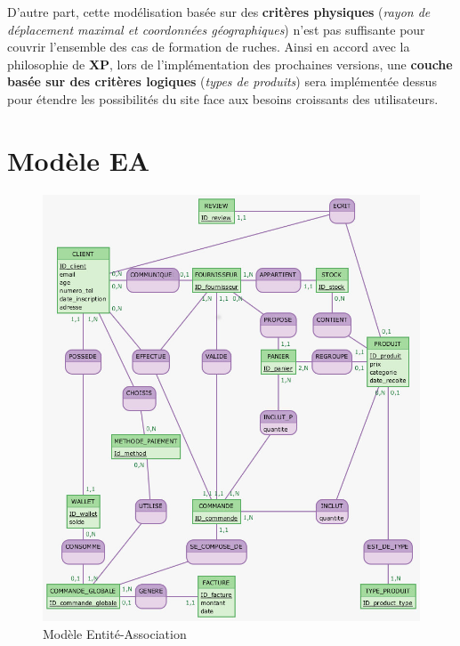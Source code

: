 \documentclass[a4paper,12pt]{report}
\theoremstyle{break}
\theoremstyle{break}
\theoremstyle{break}
\theoremstyle{break}
\theoremstyle{definition}
\theoremstyle{remark}
\begin{document}
D'autre part, cette modélisation basée sur des \textbf{critères physiques} (\textit{rayon de déplacement maximal et coordonnées géographiques}) n'est pas suffisante pour couvrir l'ensemble des cas de formation de ruches. Ainsi en accord avec la philosophie de \textbf{XP}, lors de l'implémentation des prochaines versions, une \textbf{couche basée sur des critères logiques} (\textit{types de produits}) sera implémentée dessus pour étendre les possibilités du site face aux besoins croissants des utilisateurs.
\section{Modèle EA}
\begin{figure}[!ht]
  \centering
  \includegraphics[scale=0.6]{images/Clients.jpg}
  \caption{Modèle Entité-Association}
  \label{fig:modele_EA}
\end{figure}

\newpage
\end{document}
